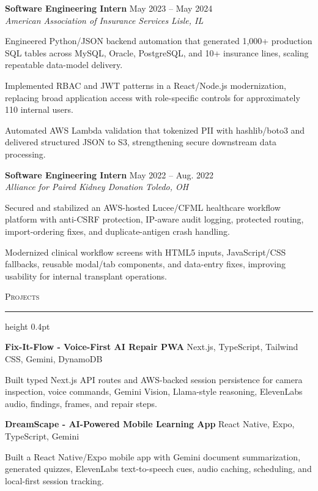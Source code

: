 \documentclass[letterpaper,11pt]{article}
\newcommand{\resumesection}[1]{%
  \par\vspace{2pt}%
  {\large\scshape #1}\par\vspace{2pt}%
  \hrule height 0.4pt\vspace{2pt}%
}
\newcommand{\resumeSubheading}[4]{
  \textbf{#1} \hfill #2\\
  \textit{#3} \hfill \textit{#4}
}
\newcommand{\projectHeading}[2]{
  \textbf{#1} \hfill #2
}
\begin{document}
\resumeSubheading
{Software Engineering Intern}{May 2023 -- May 2024}
{American Association of Insurance Services}{Lisle, IL}
\begin{tightitemize}
  \item Engineered Python/JSON backend automation that generated 1,000+ production SQL tables across MySQL, Oracle, PostgreSQL, and 10+ insurance lines, scaling repeatable data-model delivery.
  \item Implemented RBAC and JWT patterns in a React/Node.js modernization, replacing broad application access with role-specific controls for approximately 110 internal users.
  \item Automated AWS Lambda validation that tokenized PII with hashlib/boto3 and delivered structured JSON to S3, strengthening secure downstream data processing.
\end{tightitemize}

\resumeSubheading
{Software Engineering Intern}{May 2022 -- Aug. 2022}
{Alliance for Paired Kidney Donation}{Toledo, OH}
\begin{tightitemize}
  \item Secured and stabilized an AWS-hosted Lucee/CFML healthcare workflow platform with anti-CSRF protection, IP-aware audit logging, protected routing, import-ordering fixes, and duplicate-antigen crash handling.
  \item Modernized clinical workflow screens with HTML5 inputs, JavaScript/CSS fallbacks, reusable modal/tab components, and data-entry fixes, improving usability for internal transplant operations.
\end{tightitemize}

\resumesection{Projects}
\projectHeading{Fix-It-Flow - Voice-First AI Repair PWA}{Next.js, TypeScript, Tailwind CSS, Gemini, DynamoDB}
\begin{tightitemize}
  \item Built typed Next.js API routes and AWS-backed session persistence for camera inspection, voice commands, Gemini Vision, Llama-style reasoning, ElevenLabs audio, findings, frames, and repair steps.
\end{tightitemize}

\projectHeading{DreamScape - AI-Powered Mobile Learning App}{React Native, Expo, TypeScript, Gemini}
\begin{tightitemize}
  \item Built a React Native/Expo mobile app with Gemini document summarization, generated quizzes, ElevenLabs text-to-speech cues, audio caching, scheduling, and local-first session tracking.
\end{tightitemize}
\end{document}
